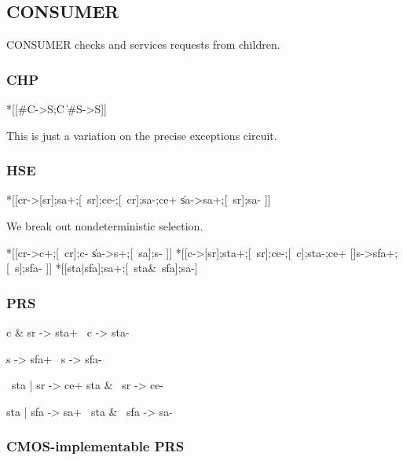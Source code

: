 \documentclass{article}
\begin{document}
\subsection{CONSUMER}

CONSUMER checks and services requests from children. 

\subsubsection*{CHP}

\begin{csp}
*[[#C->S;C
  \|#S->S]]
\end{csp}

\noindent
This is just a variation on the precise exceptions circuit.

\subsubsection*{HSE}

\begin{hse}
*[[cr->[sr];sa+;[~sr];ce-;[~cr];sa-;ce+
  \|sa->sa+;[~sr];sa-
 ]]
\end{hse}

\noindent
We break out nondeterministic selection.

\begin{hse}
*[[cr->c+;[~cr];c-
  \|sa->s+;[~sa];s-
 ]]
*[[c->[sr];sta+;[~sr];ce-;[~c];sta-;ce+
  []s->sfa+;[~s];sfa-
 ]]
*[[sta|sfa];sa+;[~sta&~sfa];sa-]
\end{hse}

\subsubsection*{PRS}

\begin{prs2}
c & sr -> sta+
~c -> sta-

s -> sfa+
~s -> sfa-
\end{prs2}

\begin{prs2}
~sta | sr -> ce+
sta & ~sr -> ce-
\end{prs2}

\begin{prs2}
sta | sfa -> sa+
~sta & ~sfa -> sa-
\end{prs2}

\subsubsection*{CMOS-implementable PRS}
\end{document}
